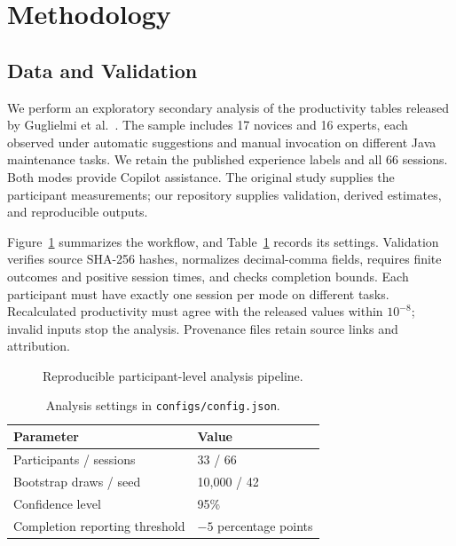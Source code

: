 \section{Methodology}
\label{sec:methodology}
\subsection{Data and Validation}
We perform an exploratory secondary analysis of the productivity tables
released by Guglielmi et al.~\cite{guglielmi2026copilot}. The sample includes
17 novices and 16 experts, each observed under automatic suggestions and
manual invocation on different Java maintenance tasks. We retain the published
experience labels and all 66 sessions. Both modes provide Copilot assistance.
The original study supplies the participant measurements; our repository
supplies validation, derived estimates, and reproducible outputs.

Figure~\ref{fig:pipeline} summarizes the workflow, and
Table~\ref{tab:parameters} records its settings. Validation verifies source
SHA-256 hashes, normalizes decimal-comma fields, requires finite outcomes and
positive session times, and checks completion bounds. Each participant must
have exactly one session per mode on different tasks. Recalculated productivity
must agree with the released values within $10^{-8}$; invalid inputs stop the
analysis. Provenance files retain source links and attribution.

\begin{figure}[t]
\centering
\begingroup\small
{}
\endgroup
\caption{Reproducible participant-level analysis pipeline.}
\label{fig:pipeline}
\end{figure}

\begin{table}[t]
\caption{Analysis settings in \texttt{configs/config.json}.}
\label{tab:parameters}
\centering
\begin{tabular}{@{}ll@{}}
\toprule
Parameter & Value \\
\midrule
Participants / sessions & 33 / 66 \\
Bootstrap draws / seed & 10,000 / 42 \\
Confidence level & 95\% \\
Completion reporting threshold & $-5$ percentage points \\
\bottomrule
\end{tabular}
\end{table}

